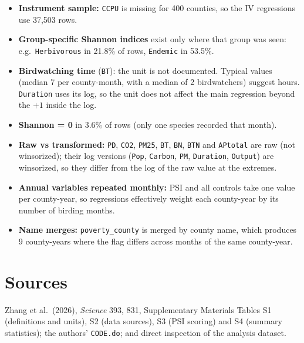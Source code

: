 \documentclass[10pt]{article}
\begin{document}
\begin{keybox}
\small
\begin{itemize}[leftmargin=12pt]
\item \textbf{Instrument sample:} \texttt{CCPU} is missing for 400 counties, so the IV regressions use 37,503 rows.
\item \textbf{Group-specific Shannon indices} exist only where that group was seen: e.g.\ \texttt{Herbivorous} in 21.8\% of rows, \texttt{Endemic} in 53.5\%.
\item \textbf{Birdwatching time} (\texttt{BT}): the unit is not documented. Typical values (median 7 per county-month, with a median of 2 birdwatchers) suggest hours. \texttt{Duration} uses its log, so the unit does not affect the main regression beyond the $+1$ inside the log.
\item \textbf{Shannon = 0} in 3.6\% of rows (only one species recorded that month).
\item \textbf{Raw vs transformed:} \texttt{PD}, \texttt{CO2}, \texttt{PM25}, \texttt{BT}, \texttt{BN}, \texttt{BTN} and \texttt{APtotal} are raw (not winsorized); their log versions (\texttt{Pop}, \texttt{Carbon}, \texttt{PM}, \texttt{Duration}, \texttt{Output}) are winsorized, so they differ from the log of the raw value at the extremes.
\item \textbf{Annual variables repeated monthly:} PSI and all controls take one value per county-year, so regressions effectively weight each county-year by its number of birding months.
\item \textbf{Name merges:} \texttt{poverty\_county} is merged by county name, which produces 9 county-years where the flag differs across months of the same county-year.
\end{itemize}
\end{keybox}

\section*{Sources}
\small
Zhang et al.\ (2026), \textit{Science} 393, 831, Supplementary Materials Tables S1 (definitions and units), S2 (data sources), S3 (PSI scoring) and S4 (summary statistics); the authors' \texttt{CODE.do}; and direct inspection of the analysis dataset.
\end{document}
